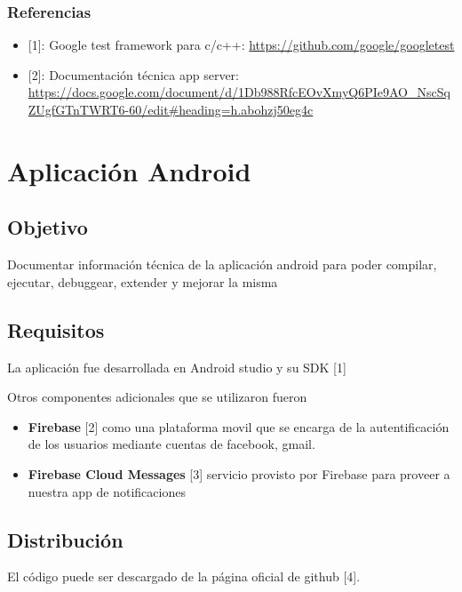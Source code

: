 \documentclass[a4paper,10pt,spanish]{sphinxmanual}
\begin{document}
\subsection{Referencias}
\label{testing:referencias}\begin{itemize}
\item {} 
{[}1{]}: Google test framework para c/c++: \url{https://github.com/google/googletest}

\item {} 
{[}2{]}: Documentación técnica app server: \url{https://docs.google.com/document/d/1Db988RfcEOvXmyQ6PIe9AO\_NscSqZUgfGTnTWRT6-60/edit\#heading=h.abohzj50eg4c}

\end{itemize}


\chapter{Aplicación Android}
\label{index:aplicacion-android}

\section{Objetivo}
\label{appAndroid:objetivo}\label{appAndroid::doc}
Documentar información técnica de la aplicación android para poder compilar, ejecutar, debuggear, extender y mejorar la misma


\section{Requisitos}
\label{appAndroid:requisitos}
La aplicación fue desarrollada en Android studio y su SDK {[}1{]}

Otros componentes adicionales que se utilizaron fueron
\begin{itemize}
\item {} 
\textbf{Firebase} {[}2{]} como una plataforma movil que se encarga de la autentificación de los usuarios mediante cuentas de facebook, gmail.

\item {} 
\textbf{Firebase Cloud Messages} {[}3{]} servicio provisto por Firebase para proveer a nuestra app de notificaciones

\end{itemize}


\section{Distribución}
\label{appAndroid:distribucion}
El código puede ser descargado de la página oficial de github {[}4{]}.
\end{document}
